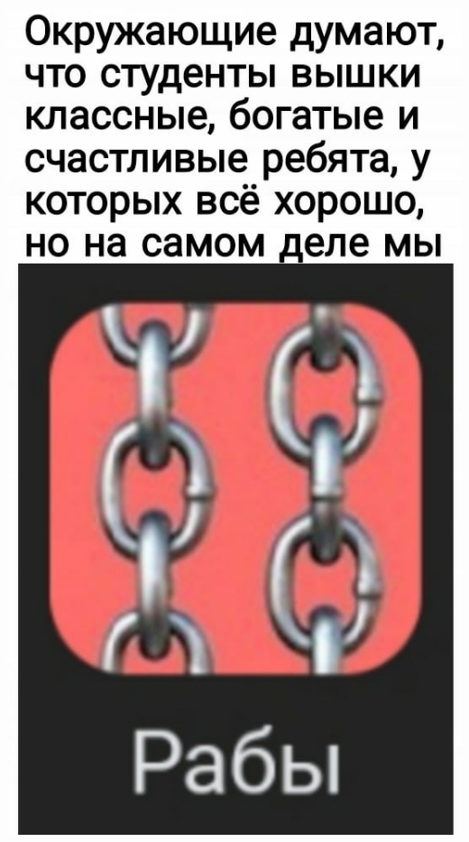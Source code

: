 \documentclass[a4paper,12pt]{article}
\begin{document}
\clearpage
\begin{center}
\includegraphics[scale=0.6]{1.jpg}
\end{center}
\end{document}
